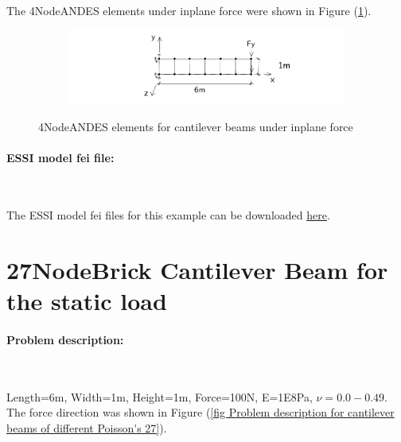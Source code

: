 \documentclass[fleqn,11pt]{article}
\begin{document}
The 4NodeANDES elements under inplane force were shown in Figure (\ref{fig 4NodeANDES elements for cantilever beams under inplane force}).

\begin{figure}[H]
  \centering
  \vskip 8pt
  \begin{subfigure}{0.5\textwidth}
    \centering
    \includegraphics[width=10cm]{../Figure-files/beam_ANDES_yz_inPlane_6div.pdf}
  \end{subfigure}
  \captionsetup{justification=centering,margin=3cm}
  \caption{4NodeANDES elements for cantilever beams under inplane force}
  \label{fig 4NodeANDES elements for cantilever beams under inplane force}
\end{figure}


\paragraph{ESSI model fei file: } ~




The ESSI model fei files for this example can be downloaded \href{https://github.com/yuan-energy/Real-ESSI-Examples/blob/master/model_fei_file/ANDESshell_cantilever_inplane/ANDESshell_cantilever_inplane.tgz?raw=true}{here}.








\newpage
\section{27NodeBrick Cantilever Beam for the static load}

\paragraph{Problem description: } ~

Length=6m, Width=1m, Height=1m, Force=100N, E=1E8Pa, $\nu=0.0-0.49$.
The force direction was shown in Figure (\ref{fig Problem description for cantilever beams of different Poisson's 27}). 
\end{document}

